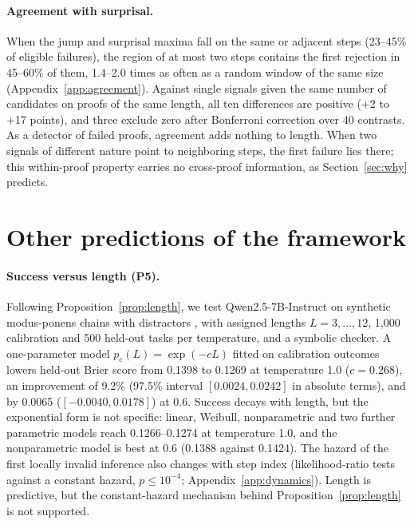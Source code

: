 \paragraph{Agreement with surprisal.} When the jump and surprisal maxima fall on the same or adjacent steps (23--45\% of eligible failures), the region of at most two steps contains the first rejection in 45--60\% of them, 1.4--2.0 times as often as a random window of the same size (Appendix~\ref{app:agreement}). Against single signals given the same number of candidates on proofs of the same length, all ten differences are positive (+2 to +17 points), and three exclude zero after Bonferroni correction over 40 contrasts. As a detector of failed proofs, agreement adds nothing to length. When two signals of different nature point to neighboring steps, the first failure lies there; this within-proof property carries no cross-proof information, as Section~\ref{sec:why} predicts.

\section{Other predictions of the framework}\label{sec:other}

\paragraph{Success versus length (P5).} Following Proposition~\ref{prop:length}, we test Qwen2.5-7B-Instruct \citep{qwen2024} on synthetic modus-ponens chains with distractors \citep{saparov2023}, with assigned lengths $L=3,\dots,12$, 1,000 calibration and 500 held-out tasks per temperature, and a symbolic checker. A one-parameter model $p_c(L)=\exp(-cL)$ fitted on calibration outcomes lowers held-out Brier score from 0.1398 to 0.1269 at temperature 1.0 ($c=0.268$), an improvement of 9.2\% (97.5\% interval $[0.0024, 0.0242]$ in absolute terms), and by 0.0065 ($[-0.0040, 0.0178]$) at 0.6. Success decays with length, but the exponential form is not specific: linear, Weibull, nonparametric and two further parametric models reach 0.1266--0.1274 at temperature 1.0, and the nonparametric model is best at 0.6 (0.1388 against 0.1424). The hazard of the first locally invalid inference also changes with step index (likelihood-ratio tests against a constant hazard, $p\le10^{-4}$; Appendix~\ref{app:dynamics}). Length is predictive, but the constant-hazard mechanism behind Proposition~\ref{prop:length} is not supported.

